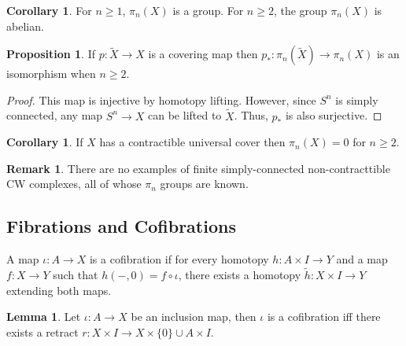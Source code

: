\documentclass[12pt]{extarticle}
\newcommand{\id}{\mathrm{id}}
\theoremstyle{definition}
\newtheorem{lemma}[theorem]{Lemma}
\newtheorem{proposition}[theorem]{Proposition}
\newtheorem{corollary}[theorem]{Corollary}
\newtheorem{remark}{Remark}
\newenvironment{definition}[1][Definition:]{\begin{trivlist}
\item[\hskip \labelsep {\bfseries #1}]}{\end{trivlist}}
\begin{document}
\begin{corollary}
For $n \ge 1$, $\pi_n(X)$ is a group. For $n \ge 2$, the group $\pi_n(X)$ is abelian. 
\end{corollary}

\begin{proposition}
If $p : \tilde{X} \to X$ is a covering map then $p_* : \pi_n(\tilde{X}) \to \pi_n(X)$ is an isomorphism when $n \ge 2$.
\end{proposition}

\begin{proof}
This map is injective by homotopy lifting. However, since $S^n$ is simply connected, any map $S^n \to X$ can be lifted to $\tilde{X}$. Thus, $p_*$ is also surjective.
\end{proof}

\begin{corollary}
If $X$ has a contractible universal cover then $\pi_n(X) = 0$ for $n \ge 2$. 
\end{corollary}


\begin{remark}
There are no examples of finite simply-connected non-contracttible CW complexes, all of whose $\pi_n$ groups are known.
\end{remark}


\subsection{Fibrations and Cofibrations}

\begin{definition}
A map $ \iota : A \to X$ is a cofibration if for every homotopy $h : A \times I \to Y$ and a map $f : X \to Y$ such that $h(-, 0) = f \circ \iota$, there exists a homotopy $\tilde{h} : X \times I \to Y$ extending both maps.
\begin{center}
\end{center}
\end{definition}

\begin{lemma}
Let $\iota : A \to X$ be an inclusion map, then $\iota$ is a cofibration iff there exists a retract $r : X \times I \to X \times \{0\} \cup A \times I$. 
\end{lemma}
\end{document}
